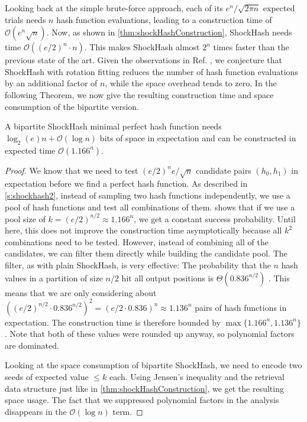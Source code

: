\documentclass[a4paper,USenglish,cleveref]{lipics-v2021}
\newcommand{\Oh}{\mathcal{O}}
\begin{document}
Looking back at the simple brute-force approach, each of its $e^n/\sqrt{2 \pi n}$ expected trials needs $n$ hash function evaluations, leading to a construction time of $\Oh(e^n \sqrt{n})$.
Now, as shown in \cref{thm:shockHashConstruction}, ShockHash needs time $\Oh((e/2)^n \cdot n)$.
This makes ShockHash almost $2^n$ times faster than the previous state of the art.
Given the observations in Ref. \cite{bez2023high}, we conjecture that ShockHash with rotation fitting reduces the number of hash function evaluations by an additional factor of $n$, while the space overhead tends to zero.
In the following Theorem, we now give the resulting construction time and space consumption of the bipartite version.
\begin{theorem}
  \label{thm:bipartiteShockHashConstruction}
  A bipartite ShockHash minimal perfect hash function needs $\log_2(e)n + \Oh(\log n)$ bits of space in expectation and can be constructed in expected time $\Oh(1.166^n)$.
\end{theorem}
\begin{proof}
  We know that we need to test $(e/2)^{n}e/\sqrt{n}$ candidate pairs $(h_0,h_1)$ in expectation before we find a perfect hash function.
  As described in \cref{s:shockhash2}, instead of sampling two hash functions independently, we use a pool of hash functions and test all combinations of them.
   shows that if we use a pool size of $k = (e/2)^{n/2} \approx 1.166^n$, we get a constant success probability.
  Until here, this does not improve the construction time asymptotically because all $k^2$ combinations need to be tested.
  However, instead of combining all of the candidates, we can filter them directly while building the candidate pool.
  The filter, as with plain ShockHash, is very effective:
  The probability that the $n$ hash values in a partition of size $n/2$ hit all output positions is $\Theta(0.836^{n/2})$ \cite{walzer2024probability}.
  This means that we are only considering about $((e/2)^{n/2} \cdot 0.836^{n/2})^2 = (e/2 \cdot 0.836)^n \approx 1.136^n$ pairs of hash functions in expectation.
  The construction time is therefore bounded by $\max \{1.166^n, 1.136^n\}$.
  Note that both of these values were rounded up anyway, so polynomial factors are dominated.

  Looking at the space consumption of bipartite ShockHash, we need to encode two seeds of expected value $\leq k$ each.
  Using Jensen's inequality and the retrieval data structure just like in \cref{thm:shockHashConstruction}, we get the resulting space usage.
  The fact that we suppressed polynomial factors in the analysis disappears in the $\Oh(\log n)$ term.
\end{proof}
\end{document}
